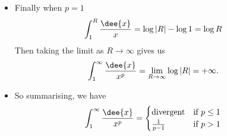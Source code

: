 \begin{eg}
\begin{itemize}
\item Finally when $p=1$
\begin{align*}
\int_1^R\frac{\dee{x}}{x} &= \log|R|-\log 1 = \log R
\end{align*}
Then taking the limit as $R \to \infty$ gives us
\begin{align*}
\int_1^\infty\frac{\dee{x}}{x^p} &= \lim_{R \to \infty} \log|R| = +\infty.
\end{align*}
\item So summarising, we have
\begin{align*}
\int_1^\infty\frac{\dee{x}}{x^p}
&=\begin{cases}
   \text{divergent} & \text {if } p\le 1 \\
   \frac{1}{p-1} & \text{if } p>1
  \end{cases}
\end{align*}
\end{itemize}

\end{eg}


